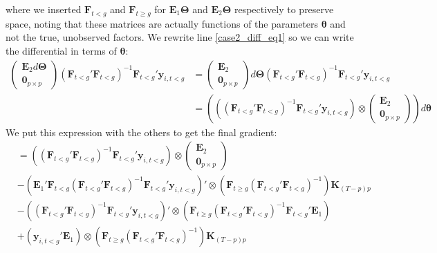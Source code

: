 where we inserted $\bm F_{t < g}$ and $\bm F_{t \geq g}$ for $\bm E_1 \bm \Theta$ and $\bm E_2 \bm \Theta$ respectively to preserve space, noting that these matrices are actually functions of the parameters $\bm \theta$ and not the true, unobserved factors. We rewrite line \eqref{case2_diff_eq1} so we can write the differential in terms of $\bm \theta$: 
\begin{align}
    \begin{pmatrix}
        \bm E_2 d \bm \Theta\\
        \bm 0_{p \times p}
    \end{pmatrix}
    \left( \bm F_{t < g}' \bm F_{t < g} \right)^{-1} \bm F_{t < g}' \bm y_{i, t < g} 
    &= 
    \begin{pmatrix}
        \bm E_2\\
        \bm 0_{p \times p}
    \end{pmatrix}
    d \bm \Theta
    \left( \bm F_{t < g}' \bm F_{t < g} \right)^{-1} \bm F_{t < g}' \bm y_{i, t < g}\\
    &=
    \left( \left( \left( \bm F_{t < g}' \bm F_{t < g} \right)^{-1} \bm F_{t < g}' \bm y_{i, t < g} \right) \otimes 
        \begin{pmatrix}
        \bm E_2\\
        \bm 0_{p \times p}
    \end{pmatrix}
    \right)
    d \bm \theta
\end{align}
We put this expression with the others to get the final gradient: 
\begin{align}
    &= \left( \left( \bm F_{t < g}' \bm F_{t < g} \right)^{-1} \bm F_{t < g}' \bm y_{i, t < g} \right) \otimes 
        \begin{pmatrix}
        \bm E_2\\
        \bm 0_{p \times p}
    \end{pmatrix}\\
    &
    - \left( \bm E_1' \bm F_{t < g} \left( \bm F_{t < g}' \bm F_{t < g} \right)^{-1} \bm F_{t < g}' \bm y_{i,t < g} \right)' \otimes \left( \bm F_{t \geq g} \left( \bm F_{t < g}' \bm F_{t < g} \right)^{-1} \right) \bm K_{(T-p)p}\\
    &
    - \left( \left( \bm F_{t < g}' \bm F_{t < g} \right)^{-1} \bm F_{t < g}' \bm y_{i,t < g} \right)' \otimes \left( \bm F_{t \geq g} \left( \bm F_{t < g}' \bm F_{t < g} \right)^{-1} \bm F_{t < g}' \bm E_1 \right)\\
    &
    + \left( \bm y_{i,t < g}' \bm E_1 \right) \otimes \left( \bm F_{t \geq g} \left( \bm F_{t < g}' \bm F_{t < g} \right)^{-1} \right) \bm K_{(T-p)p}
\end{align}



